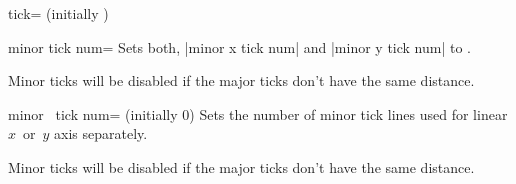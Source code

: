 \begin{pgfplotsxykey}{\x tick= (initially \marg{})}
\begin{codeexample}[]
\end{codeexample}

\begin{codeexample}[]
\end{codeexample}
\end{pgfplotsxykey}

\begin{pgfplotskey}{minor tick num=}
	Sets both, |minor x tick num| and |minor y tick num| to .

	Minor ticks will be disabled if the major ticks don't have the same distance.
\begin{codeexample}[]
\end{codeexample}

\begin{codeexample}[]
\end{codeexample}

\end{pgfplotskey}

\begin{pgfplotsxykey}{minor \x\ tick num= (initially 0)}
	Sets the number of minor tick lines used for linear $x$~or~$y$ axis separately.

	Minor ticks will be disabled if the major ticks don't have the same distance.
\begin{codeexample}[]
\end{codeexample}

\end{pgfplotsxykey}

